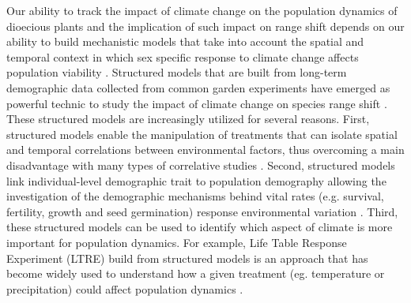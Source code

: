 \documentclass[12pt]{article}
\begin{document}
Our ability to track the impact of climate change on the population dynamics of dioecious plants and the implication of such impact on range shift depends on our ability to build mechanistic models that take into account the spatial and temporal context in which sex specific response to climate change affects population viability \citep{davis2001range,evans2016towards,czachura2020demographic}.
Structured models that are built from long-term demographic data collected from common garden experiments have emerged as powerful technic to study the impact of climate change on species range shift \citep{merow2017climate,schwinning2022common}.
These structured models are increasingly utilized for several reasons. 
First, structured models enable the manipulation of treatments that can isolate spatial and temporal correlations between environmental factors, thus overcoming a main disadvantage with many types of correlative studies \citep{leicht2007comparative}. 
Second, structured models link individual-level demographic trait to population demography allowing the investigation of the demographic mechanisms behind vital rates (e.g. survival, fertility, growth and seed germination) response environmental variation \citep{louthan2022climate,dahlgren2016demography}. 
Third, these structured models can be used to identify which aspect of climate is more important for population dynamics.
For example, Life Table Response Experiment (LTRE) build from structured models is an approach that has become widely used to understand how a given treatment (eg. temperature or precipitation) could affect population dynamics \citep {caswell1989analysis,o2024nonlinear,morrison2007demographic,iler2019reproductive}. 
\end{document}
